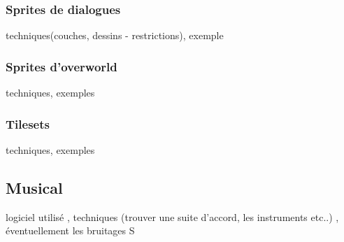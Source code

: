 \documentclass[11pt]{article}
\begin{document}
\subsubsection{Sprites de dialogues}
techniques(couches, dessins - restrictions), exemple 
\subsubsection{Sprites d'overworld}
techniques, exemples
\subsubsection{Tilesets}
techniques, exemples
\subsection{Musical}
logiciel utilisé , techniques (trouver une suite d'accord, les instruments etc..) , éventuellement les bruitages 
S
\end{document}
